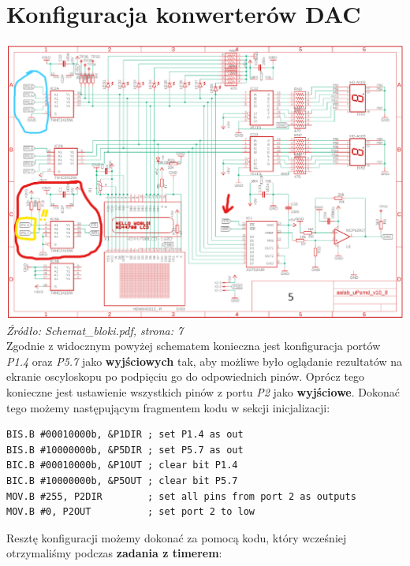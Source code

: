 \documentclass{article}
\begin{document}
\section{Konfiguracja konwerterów DAC}
\includegraphics[width=\textwidth]{"../adc_img/Schemat_bloki_7.png"}
\textit{Źródło: Schemat\_bloki.pdf, strona: 7}
\vspace{3mm} \\
Zgodnie z widocznym powyżej schematem konieczna jest konfiguracja portów \textit{P1.4} oraz \textit{P5.7} jako \textbf{wyjściowych} tak, aby możliwe było oglądanie rezultatów na ekranie oscyloskopu po podpięciu go do odpowiednich pinów.
Oprócz tego konieczne jest ustawienie wszystkich pinów z portu \textit{P2} jako \textbf{wyjściowe}.
Dokonać tego możemy następującym fragmentem kodu w sekcji inicjalizacji:
\begin{verbatim}
BIS.B #00010000b, &P1DIR ; set P1.4 as out
BIS.B #10000000b, &P5DIR ; set P5.7 as out
BIC.B #00010000b, &P1OUT ; clear bit P1.4
BIC.B #10000000b, &P5OUT ; clear bit P5.7
MOV.B #255, P2DIR        ; set all pins from port 2 as outputs
MOV.B #0, P2OUT          ; set port 2 to low \end{verbatim}
\newpage
Resztę konfiguracji możemy dokonać za pomocą kodu, który wcześniej otrzymaliśmy podczas \textbf{zadania z timerem}:
\end{document}
